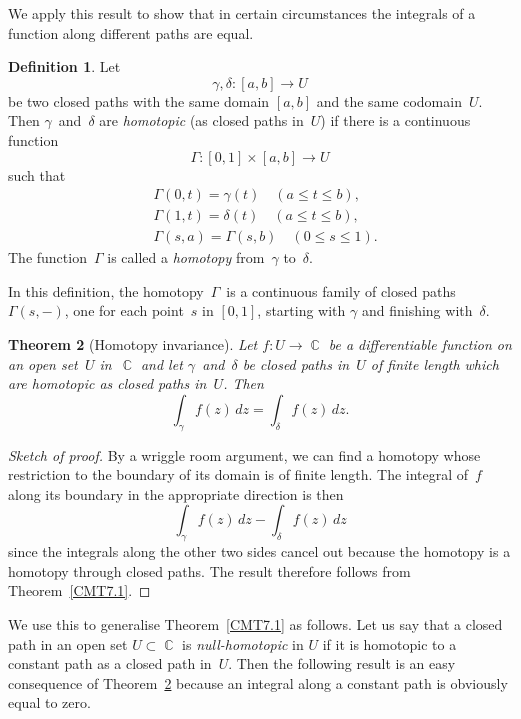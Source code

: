 \documentclass{amsproc}
\newtheorem{theorem}{Theorem}[subsection]
\theoremstyle{definition}
\newtheorem{definition}[theorem]{Definition}
\theoremstyle{remark}
\DeclareMathOperator{\C}{\mathbb{C}}
\numberwithin{equation}{section}
\begin{document}
We apply this result to show that in certain circumstances the integrals of a function along different paths are equal.

\begin{definition} \label{CMD7.2}
Let
$$
\gamma,\delta:[a,b] \to U
$$
be two closed paths with the same domain $ [a,b] $ and the same codomain~$ U $. Then $ \gamma $~and~$ \delta $ are \emph{homotopic} (as closed paths in~$ U $) if there is a
continuous function
$$
\Gamma: [0,1] \times [a,b] \to U
$$
such that
\begin{align*}
&\Gamma(0,t) = \gamma(t) \quad (a \leq t \leq b),\\
&\Gamma(1,t) = \delta(t) \quad (a \leq t \leq b),\\
&\Gamma(s,a) = \Gamma(s,b) \quad (0 \leq s \leq 1).
\end{align*}
The function~$ \Gamma $ is called a \emph{homotopy} from~$ \gamma $ to~$ \delta $.
\end{definition}

In this definition, the homotopy~$ \Gamma $~is a continuous family of closed paths $ \Gamma(s,-) $, one for each point~$ s $ in $ [0,1] $, starting with $ \gamma $ and
finishing with~$ \delta $.

\begin{theorem}[Homotopy invariance] \label{CMT7.3}
Let $ f: U \to \C $ be a differentiable function on an open set~$ U $ in~$ \C $ and let $ \gamma $~and~$ \delta $ be closed paths in~$ U $ of finite length which are homotopic as
closed paths in~$ U $. Then
$$
\int_\gamma f(z)\,dz = \int_\delta f(z)\,dz.
$$
\end{theorem}

\begin{proof}[Sketch of proof]
By a wriggle room argument, we can find a homotopy whose restriction to the boundary of its domain is of finite length. The integral of~$ f $ along its boundary in the appropriate direction is then
$$
\int_\gamma f(z)\,dz - \int_\delta f(z)\,dz
$$
since the integrals along the other two sides cancel out because the homotopy is a homotopy through closed paths. The result therefore follows from Theorem~\ref{CMT7.1}.
\end{proof}

We use this to generalise Theorem~\ref{CMT7.1} as follows. Let us say that a closed path in an open set $ U \subset \C $ is \emph{null-homotopic} in $ U $ if it is homotopic to a
constant path as a closed path in~$ U $. Then the following result is an easy consequence of Theorem~\ref{CMT7.3} because an integral along a constant path is obviously
equal to zero.
\end{document}
